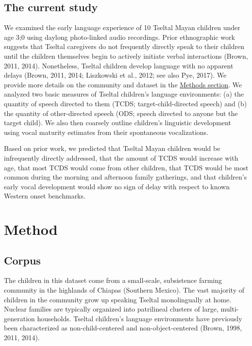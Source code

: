 \documentclass[floatsintext,man]{apa6}
\theoremstyle{definition}
\theoremstyle{definition}
\theoremstyle{definition}
\theoremstyle{remark}
\begin{document}
\subsection{The current study}\label{intro-currentstudy}

We examined the early language experience of 10 Tseltal Mayan children
under age 3;0 using daylong photo-linked audio recordings. Prior
ethnographic work suggests that Tseltal caregivers do not frequently
directly speak to their children until the children themselves begin to
actively initiate verbal interactions (Brown, 2011, 2014). Nonetheless,
Tseltal children develop language with no apparent delays (Brown, 2011,
2014; Liszkowski et al., 2012; see also Pye, 2017). We provide more
details on the community and dataset in the
\protect\hyperlink{methods}{Methods section}. We analyzed two basic
measures of Tseltal children's language environments: (a) the quantity
of speech directed to them (TCDS; target-child-directed speech) and (b)
the quantity of other-directed speech (ODS; speech directed to anyone
but the target child). We also then coarsely outline children's
linguistic development using vocal maturity estimates from their
spontaneous vocalizations.

Based on prior work, we predicted that Tseltal Mayan children would be
infrequently directly addressed, that the amount of TCDS would increase
with age, that most TCDS would come from other children, that TCDS would
be most common during the morning and afternoon family gatherings, and
that children's early vocal development would show no sign of delay with
respect to known Western onset benchmarks.

\hypertarget{methods}{\section{Method}\label{methods}}

\subsection{Corpus}\label{methods-dataset}

The children in this dataset come from a small-scale, subsistence
farming community in the highlands of Chiapas (Southern Mexico). The
vast majority of children in the community grow up speaking Tseltal
monolingually at home. Nuclear families are typically organized into
patrilineal clusters of large, multi-generation households. Tseltal
children's language environments have previously been characterized as
non-child-centered and non-object-centered (Brown, 1998, 2011, 2014).
\end{document}
